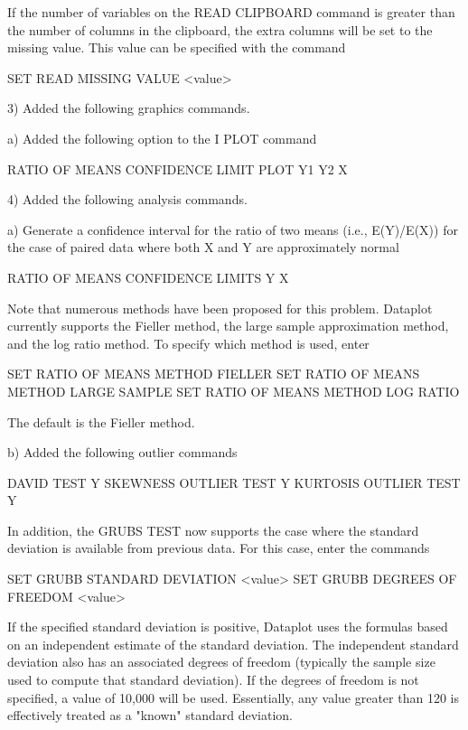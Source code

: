            If the number of variables on the READ CLIPBOARD command is
            greater than the number of columns in the clipboard, the
            extra columns will be set to the missing value.  This value
            can be specified with the command

                SET READ MISSING VALUE <value>

 3) Added the following graphics commands.

    a) Added the following option to the I PLOT command

          RATIO OF MEANS CONFIDENCE LIMIT PLOT Y1 Y2 X

 4) Added the following analysis commands.

    a) Generate a confidence interval for the ratio of two means
       (i.e., E(Y)/E(X)) for the case of paired data where both X and Y
       are approximately normal

          RATIO OF MEANS CONFIDENCE LIMITS Y X

       Note that numerous methods have been proposed for this problem.
       Dataplot currently supports the Fieller method, the large sample
       approximation method, and the log ratio method.  To specify which
       method is used, enter

          SET RATIO OF MEANS METHOD FIELLER
          SET RATIO OF MEANS METHOD LARGE SAMPLE
          SET RATIO OF MEANS METHOD LOG RATIO

       The default is the Fieller method.  

    b) Added the following outlier commands

         DAVID TEST Y
         SKEWNESS OUTLIER TEST Y
         KURTOSIS OUTLIER TEST Y

       In addition, the GRUBS TEST now supports the case where the
       standard deviation is available from previous data.  For
       this case, enter the commands

            SET GRUBB STANDARD DEVIATION <value>
            SET GRUBB DEGREES OF FREEDOM <value>

       If the specified standard deviation is positive, Dataplot
       uses the formulas based on an independent estimate of the
       standard deviation.  The independent standard deviation also
       has an associated degrees of freedom (typically the sample
       size used to compute that standard deviation).  If the
       degrees of freedom is not specified, a value of 10,000 will
       be used.  Essentially, any value greater than 120 is
       effectively treated as a "known" standard deviation.


